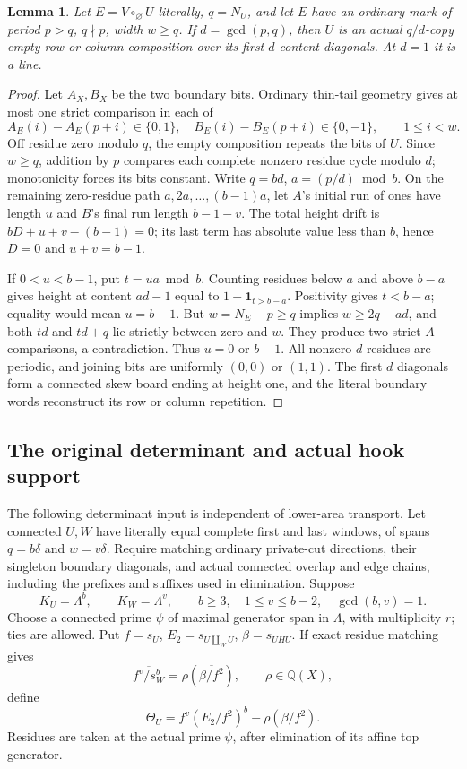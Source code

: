 \documentclass[11pt,a4paper]{amsart}
\numberwithin{equation}{section}
\theoremstyle{plain}
\newtheorem{lemma}[theorem]{Lemma}
\theoremstyle{definition}
\begin{document}
\begin{lemma}\label{lem:wide-ordinary}
Let \(E=V\circ_\varnothing U\) literally, \(q=N_U\), and let \(E\) have an ordinary mark of period \(p>q\), \(q\nmid p\), width \(w\ge q\).  If \(d=\gcd(p,q)\), then \(U\) is an actual \(q/d\)-copy empty row or column composition over its first \(d\) content diagonals.  At \(d=1\) it is a line.
\end{lemma}
\begin{proof}
Let \(A_X,B_X\) be the two boundary bits.  Ordinary thin-tail geometry gives at most one strict comparison in each of
\[
 A_E(i)-A_E(p+i)\in\{0,1\},\quad
 B_E(i)-B_E(p+i)\in\{0,-1\},\qquad1\le i<w.
\]
Off residue zero modulo \(q\), the empty composition repeats the bits of \(U\).  Since \(w\ge q\), addition by \(p\) compares each complete nonzero residue cycle modulo \(d\); monotonicity forces its bits constant.  Write \(q=bd\), \(a=(p/d)\bmod b\).  On the remaining zero-residue path \(a,2a,\ldots,(b-1)a\), let \(A\)'s initial run of ones have length \(u\) and \(B\)'s final run length \(b-1-v\).  The total height drift is \(bD+u+v-(b-1)=0\); its last term has absolute value less than \(b\), hence \(D=0\) and \(u+v=b-1\).

If \(0<u<b-1\), put \(t=ua\bmod b\).  Counting residues below \(a\) and above \(b-a\) gives height at content \(ad-1\) equal to \(1-\mathbf1_{t>b-a}\).  Positivity gives \(t<b-a\); equality would mean \(u=b-1\).  But \(w=N_E-p\ge q\) implies \(w\ge2q-ad\), and both \(td\) and \(td+q\) lie strictly between zero and \(w\).  They produce two strict \(A\)-comparisons, a contradiction.  Thus \(u=0\) or \(b-1\).  All nonzero \(d\)-residues are periodic, and joining bits are uniformly \((0,0)\) or \((1,1)\).  The first \(d\) diagonals form a connected skew board ending at height one, and the literal boundary words reconstruct its row or column repetition.
\end{proof}

\subsection{The original determinant and actual hook support}\label{subsec:determinant-import}

The following determinant input is independent of lower-area transport.  Let connected \(U,W\) have literally equal complete first and last windows, of spans \(q=b\delta\) and \(w=v\delta\).  Require matching ordinary private-cut directions, their singleton boundary diagonals, and actual connected overlap and edge chains, including the prefixes and suffixes used in elimination.  Suppose
\[
 K_U=\Lambda^b,\qquad K_W=\Lambda^v,\qquad
 b\ge3,\quad1\le v\le b-2,\quad\gcd(b,v)=1.
\]
Choose a connected prime \(\psi\) of maximal generator span in \(\Lambda\), with multiplicity \(r\); ties are allowed.  Put \(f=s_U\), \(E_2=s_{U\amalg_WU}\), \(\beta=s_{UHU}\).  If exact residue matching gives
\[
 \overline{f^v/s_W^b}=\rho(\overline{\beta/f^2}),\qquad \rho\in\mathbb Q(X),
\]
define
\begin{equation}\label{eq:imported-defect}
 \Theta_U=f^v(E_2/f^2)^b-\rho(\beta/f^2).
\end{equation}
Residues are taken at the actual prime \(\psi\), after elimination of its affine top generator.
\end{document}
